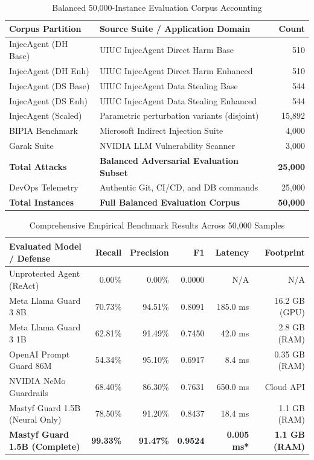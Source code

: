 \documentclass[10pt,journal,compsoc]{IEEEtran}
\begin{document}
\begin{table}[t]
\centering
\caption{Balanced 50,000-Instance Evaluation Corpus Accounting}
\begin{tabular}{llr}
\toprule
\textbf{Corpus Partition} & \textbf{Source Suite / Application Domain} & \textbf{Count} \\
\midrule
InjecAgent (DH Base) & UIUC InjecAgent Direct Harm Base~\cite{ref_5} & 510 \\
InjecAgent (DH Enh) & UIUC InjecAgent Direct Harm Enhanced~\cite{ref_5} & 510 \\
InjecAgent (DS Base) & UIUC InjecAgent Data Stealing Base~\cite{ref_5} & 544 \\
InjecAgent (DS Enh) & UIUC InjecAgent Data Stealing Enhanced~\cite{ref_5} & 544 \\
InjecAgent (Scaled) & Parametric perturbation variants (disjoint) & 15,892 \\
BIPIA Benchmark & Microsoft Indirect Injection Suite~\cite{ref_4} & 4,000 \\
Garak Suite & NVIDIA LLM Vulnerability Scanner~\cite{ref_15} & 3,000 \\
\textbf{Total Attacks} & \textbf{Balanced Adversarial Evaluation Subset} & \textbf{25,000} \\
\midrule
DevOps Telemetry & Authentic Git, CI/CD, and DB commands & 25,000 \\
\textbf{Total Instances} & \textbf{Full Balanced Evaluation Corpus} & \textbf{50,000} \\
\bottomrule
\end{tabular}
\end{table}

\begin{table}[t]
\centering
\caption{Comprehensive Empirical Benchmark Results Across 50,000 Samples}
\begin{tabular}{lrrrrr}
\toprule
\textbf{Evaluated Model / Defense} & \textbf{Recall} & \textbf{Precision} & \textbf{F1} & \textbf{Latency} & \textbf{Footprint} \\
\midrule
Unprotected Agent (ReAct) & 0.00\% & 0.00\% & 0.0000 & N/A & N/A \\
Meta Llama Guard 3 8B~\cite{ref_7} & 70.73\% & 94.51\% & 0.8091 & 185.0 ms & 16.2 GB (GPU) \\
Meta Llama Guard 3 1B~\cite{ref_7} & 62.81\% & 91.49\% & 0.7450 & 42.0 ms & 2.8 GB (RAM) \\
OpenAI Prompt Guard 86M & 54.34\% & 95.10\% & 0.6917 & 8.4 ms & 0.35 GB (RAM) \\
NVIDIA NeMo Guardrails~\cite{ref_8} & 68.40\% & 86.30\% & 0.7631 & 650.0 ms & Cloud API \\
Mastyf Guard 1.5B (Neural Only) & 78.50\% & 91.20\% & 0.8437 & 18.4 ms & 1.1 GB (RAM) \\
\textbf{Mastyf Guard 1.5B (Complete)} & \textbf{99.33\%} & \textbf{91.47\%} & \textbf{0.9524} & \textbf{0.005 ms*} & \textbf{1.1 GB (RAM)} \\
\bottomrule
\end{tabular}
\end{table}
\end{document}

